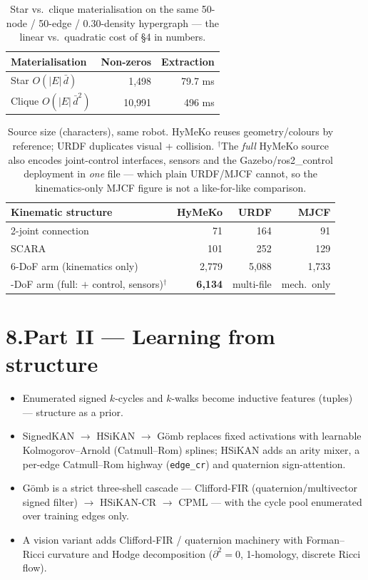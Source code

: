\documentclass[10pt]{article}
\begin{document}
\begin{table}[h]\centering\small
\caption{Star vs.\ clique materialisation on the same 50-node / 50-edge / 0.30-density hypergraph --- the linear vs.\ quadratic cost of \S4 in numbers.}
\begin{tabular}{lrr}\toprule
Materialisation & Non-zeros & Extraction\\\midrule
Star \;$O(|E|\,\bar d)$ & 1{,}498 & 79.7 ms\\
Clique \;$O(|E|\,\bar d^{2})$ & 10{,}991 & 496 ms\\\bottomrule
\end{tabular}\end{table}

\begin{table}[h]\centering\small
\caption{Source size (characters), same robot. HyMeKo reuses geometry/colours by reference; URDF duplicates visual + collision. $^\dagger$The \emph{full} HyMeKo source also encodes joint-control interfaces, sensors and the Gazebo/ros2\_control deployment in \emph{one} file --- which plain URDF/MJCF cannot, so the kinematics-only MJCF figure is not a like-for-like comparison.}
\begin{tabular}{lrrr}\toprule
Kinematic structure & HyMeKo & URDF & MJCF\\\midrule
2-joint connection & 71 & 164 & 91\\
SCARA & 101 & 252 & 129\\
6-DoF arm (kinematics only) & 2{,}779 & 5{,}088 & 1{,}733\\
\addlinespace
6-DoF arm (full: $+$ control, sensors)$^\dagger$ & \textbf{6{,}134} & multi-file & mech.\ only\\\bottomrule
\end{tabular}\end{table}

\section*{\color{accent}8.\quad Part II --- Learning from structure}
\begin{itemize}
\item Enumerated signed $k$-cycles and $k$-walks become inductive features (tuples) --- structure as a prior.
\item SignedKAN $\to$ HSiKAN $\to$ G\"omb replaces fixed activations with learnable Kolmogorov--Arnold (Catmull--Rom) splines; HSiKAN adds an arity mixer, a per-edge Catmull--Rom highway (\texttt{edge\_cr}) and quaternion sign-attention.
\item G\"omb is a strict three-shell cascade --- Clifford-FIR (quaternion/multivector signed filter) $\to$ HSiKAN-CR $\to$ CPML --- with the cycle pool enumerated over training edges only.
\item A vision variant adds Clifford-FIR / quaternion machinery with Forman--Ricci curvature and Hodge decomposition ($\partial^2{=}0$, 1-homology, discrete Ricci flow).
\end{itemize}
\end{document}
